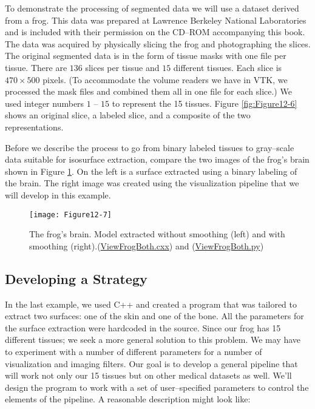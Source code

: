 To demonstrate the processing of segmented data we will use a dataset derived from a frog. This data was prepared at Lawrence Berkeley National Laboratories and is included with their permission on the CD--ROM accompanying this book. The data was acquired by physically slicing the frog and photographing the slices. The original segmented data is in the form of tissue masks with one file per tissue. There are $136$ slices per tissue and $15$ different tissues. Each slice is $470 \times 500$ pixels. (To accommodate the volume readers we have in VTK, we processed the mask files and combined them all in one file for each slice.) We used integer numbers $1$ -- $15$ to represent the 15 tissues. Figure \ref{fig:Figure12-6} shows an original slice, a labeled slice, and a composite of the two representations.

Before we describe the process to go from binary labeled tissues to gray--scale data suitable for isosurface extraction, compare the two images of the frog's brain shown in Figure \ref{fig:Figure12-7}. On the left is a surface extracted using a binary labeling of the brain. The right image was created using the visualization pipeline that we will develop in this example.

\begin{figure}[!htb]
	\centering
	\texttt{[image: Figure12-7]}
	\caption{The frog's brain. Model extracted without smoothing (left) and with smoothing (right).(\href{https://lorensen.github.io/VTKExamples/site/Cxx/Visualization/ViewFrogBoth/}{ViewFrogBoth.cxx}) and (\href{https://lorensen.github.io/VTKExamples/site/Python/Visualization/ViewFrogBoth/}{ViewFrogBoth.py})}
	\label{fig:Figure12-7}
\end{figure}

\subsection{Developing a Strategy}

In the last example, we used C++ and created a program that was tailored to extract two surfaces: one of the skin and one of the bone. All the parameters for the surface extraction were hardcoded in the source. Since our frog has 15 different tissues; we seek a more general solution to this problem. We may have to experiment with a number of different parameters for a number of visualization and imaging filters. Our goal is to develop a general pipeline that will work not only our 15 tissues but on other medical datasets as well. We'll design the program to work with a set of user--specified parameters to control the elements of the pipeline. A reasonable description might look like:

